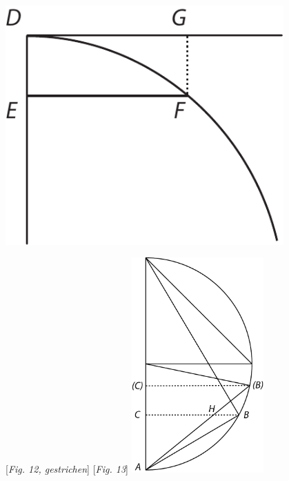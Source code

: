 \hspace*{13,3mm}
\begin{minipage}[c]{0.5\textwidth}
\includegraphics[trim = 0mm -7mm -20mm 0mm, clip, width=0.8\textwidth]{images/lh03705_006v-d3.pdf}
\end{minipage}
\pend
\vspace{0.3em}
\pstart
\hspace*{15mm}
 [\textit{Fig. 12, gestrichen}]\hspace*{50mm} [\textit{Fig. 13}]
\pend
\pstart
\noindent
\centering
 \includegraphics[trim = 0mm -4mm -5mm -6mm, clip, width=0.38\textwidth]{images/lh03705_006v-d4.pdf}\\
    \pend
\count{}
\count{}
\count{}
